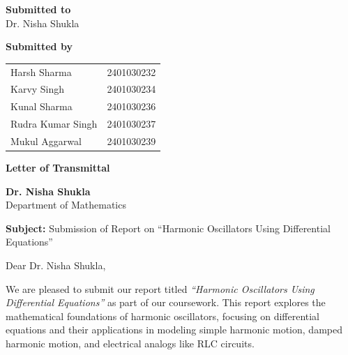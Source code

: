 \documentclass[12pt,a4paper]{article}
\begin{document}
\begin{titlepage}
    \Large
    \textbf{Submitted to}\\
    Dr. Nisha Shukla
    \vspace{1cm}

    \textbf{Submitted by}
    \vspace{0.5cm}

    \begin{tabular}{ll}
        Harsh Sharma & 2401030232 \\
        Karvy Singh & 2401030234 \\
        Kunal Sharma & 2401030236 \\
        Rudra Kumar Singh & 2401030237 \\
        Mukul Aggarwal & 2401030239 \\
    \end{tabular}

    \vspace*{\fill}
    \normalsize
\end{titlepage}


\begin{center}
    \Large\textbf{Letter of Transmittal}
\end{center}
\vspace{1cm}

\noindent
\textbf{Dr. Nisha Shukla} \\
[0.5em]
Department of Mathematics \\
[0.5em]

\vspace{1cm}

\noindent
\textbf{Subject:} Submission of Report on ``Harmonic Oscillators Using Differential Equations''

\vspace{1cm}

\noindent
Dear Dr. Nisha Shukla,

\vspace{1em}

\noindent
We are pleased to submit our report titled \textit{``Harmonic Oscillators Using Differential Equations''} as part of our coursework. This report explores the mathematical foundations of harmonic oscillators, focusing on differential equations and their applications in modeling simple harmonic motion, damped harmonic motion, and electrical analogs like RLC circuits.
\end{document}
